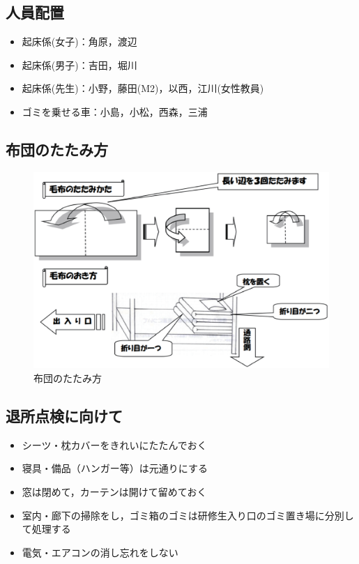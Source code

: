 \subsection{人員配置}
\begin{itemize}
\item 起床係(女子)：角原，渡辺
\item 起床係(男子)：吉田，堀川
\item 起床係(先生)：小野，藤田(M2)，以西，江川(女性教員)
\item ゴミを乗せる車：小島，小松，西森，三浦
\end{itemize}

\clearpage

\subsection{布団のたたみ方}
\begin{figure}[h]
\begin{center}
\includegraphics[scale=0.5]{./16/futon_katazuke.eps}
\caption{布団のたたみ方}
\label{fig:futon_katazuke}
\end{center}
\end{figure}

\subsection{退所点検に向けて}
\begin{itemize}
\item シーツ・枕カバーをきれいにたたんでおく
\item 寝具・備品（ハンガー等）は元通りにする
\item 窓は閉めて，カーテンは開けて留めておく
\item 室内・廊下の掃除をし，ゴミ箱のゴミは研修生入り口のゴミ置き場に分別して処理する
\item 電気・エアコンの消し忘れをしない
\end{itemize}

